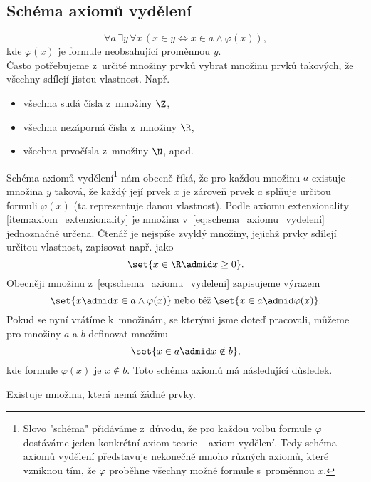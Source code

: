 \subsection{Schéma axiomů vydělení}
\begin{equation}\label{eq:schema_axiomu_vydeleni}
    \forall a\,\exists y\,\forall x\,(x\in y \iff x\in a \land \varphi(x)),
\end{equation}
kde $\varphi(x)$ je formule neobsahující proměnnou $y$.\\
Často potřebujeme z~určité množiny prvků vybrat množinu prvků takových, že všechny sdílejí jistou vlastnost. Např.
\begin{itemize}
    \item všechna sudá čísla z~množiny $\Z$,
    \item všechna nezáporná čísla z~množiny $\R$,
    \item všechna prvočísla z~množiny $\N$, apod.
\end{itemize}
Schéma axiomů vydělení\footnote{Slovo "schéma" přidáváme z~důvodu, že pro každou volbu formule $\varphi$ dostáváme jeden konkrétní axiom teorie -- axiom vydělení. Tedy schéma axiomů vydělení představuje nekonečně mnoho různých axiomů, které vzniknou tím, že $\varphi$ proběhne všechny možné formule s~proměnnou $x$.} nám obecně říká, že pro každou množinu $a$ existuje množina $y$ taková, že každý její prvek $x$ je zároveň prvek $a$ splňuje určitou formuli $\varphi(x)$ (ta reprezentuje danou vlastnost). Podle axiomu extenzionality \ref{item:axiom_extenzionality} je množina v~\eqref{eq:schema_axiomu_vydeleni} jednoznačně určena. Čtenář je nejspíše zvyklý množiny, jejichž prvky sdílejí určitou vlastnost, zapisovat např. jako
\begin{equation*}
    \set{x\in\R \admid x\geq 0}.
\end{equation*}
Obecněji množinu z~\eqref{eq:schema_axiomu_vydeleni} zapisujeme výrazem
\begin{equation*}
    \set{x \admid x\in a \land \varphi(x)}\;\text{nebo též}\;\set{x\in a\admid \varphi(x)}.
\end{equation*}
Pokud se nyní vrátíme k~množinám, se kterými jsme doteď pracovali, můžeme pro množiny $a$ a $b$ definovat množinu
\begin{equation*}
    \set{x\in a\admid x\notin b},
\end{equation*}
kde formule $\varphi(x)$ je $x\notin b$. Toto schéma axiomů má následující důsledek.
\needspace{6mm}
\begin{corollary}
    Existuje množina, která nemá žádné prvky.
\end{corollary}

